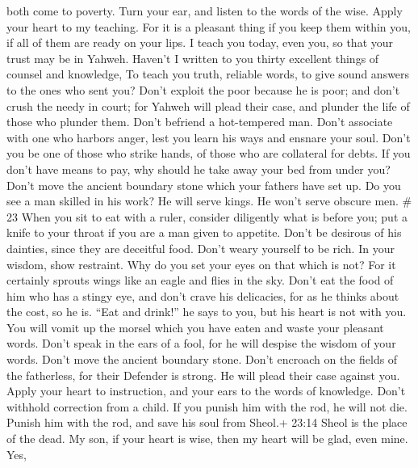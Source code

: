 both come to poverty.  Turn your ear, and listen to the
words of the wise. Apply your heart to my teaching.  For it
is a pleasant thing if you keep them within you, if all of them are
ready on your lips.  I teach you today, even you, so that
your trust may be in Yahweh.  Haven't I written to you
thirty excellent things of counsel and knowledge,  To teach
you truth, reliable words, to give sound answers to the ones who sent
you?  Don't exploit the poor because he is poor; and don't
crush the needy in court;  for Yahweh will plead their
case, and plunder the life of those who plunder them. 
Don't befriend a hot-tempered man. Don't associate with one who harbors
anger,  lest you learn his ways and ensnare your soul.
 Don't you be one of those who strike hands, of those who
are collateral for debts.  If you don't have means to pay,
why should he take away your bed from under you?  Don't
move the ancient boundary stone which your fathers have set up.
 Do you see a man skilled in his work? He will serve kings.
He won't serve obscure men. \# 23  When you sit to eat with
a ruler, consider diligently what is before you;  put a
knife to your throat if you are a man given to appetite. 
Don't be desirous of his dainties, since they are deceitful food.
 Don't weary yourself to be rich. In your wisdom, show
restraint.  Why do you set your eyes on that which is not?
For it certainly sprouts wings like an eagle and flies in the sky.
 Don't eat the food of him who has a stingy eye, and don't
crave his delicacies,  for as he thinks about the cost, so
he is. ``Eat and drink!'' he says to you, but his heart is not with you.
 You will vomit up the morsel which you have eaten and waste
your pleasant words.  Don't speak in the ears of a fool, for
he will despise the wisdom of your words.  Don't move the
ancient boundary stone. Don't encroach on the fields of the fatherless,
 for their Defender is strong. He will plead their case
against you.  Apply your heart to instruction, and your
ears to the words of knowledge.  Don't withhold correction
from a child. If you punish him with the rod, he will not die.
 Punish him with the rod, and save his soul from Sheol.+
23:14 Sheol is the place of the dead.  My son, if your
heart is wise, then my heart will be glad, even mine.  Yes,
